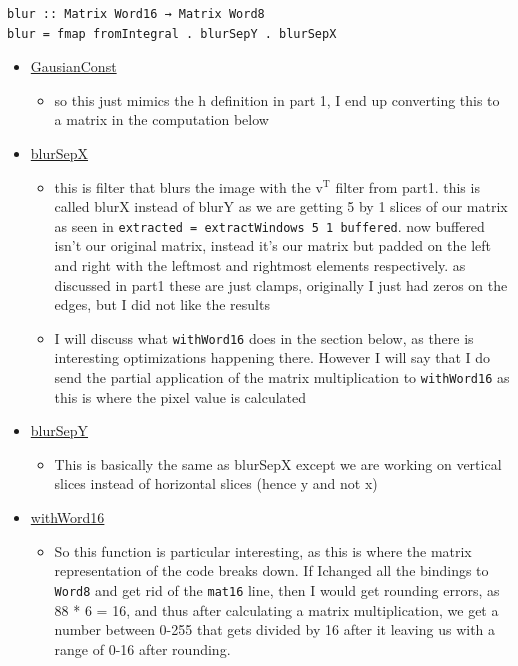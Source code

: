 \documentclass{article}
\begin{document}
\begin{enumerate}
\begin{enumerate}
\begin{itemize}
\begin{itemize}
\begin{verbatim}
blur :: Matrix Word16 → Matrix Word8
blur = fmap fromIntegral . blurSepY . blurSepX
\end{verbatim}

\begin{itemize}
\item \uline{GausianConst}
\begin{itemize}
\item so this just mimics the h definition in part 1, Ι  end up
converting this to a matrix in the computation below
\end{itemize}
\item \uline{blurSepX}
\begin{itemize}
\item this is filter that blurs the image with the v$^{\text{T}}$ filter from
part1. this is called blurX instead of blurY as we are getting
5 by 1 slices of our matrix as seen in
\texttt{extracted = extractWindows 5 1 buffered}. now buffered isn't
our original matrix, instead it's our matrix but padded on the
left and right with the leftmost and rightmost elements
respectively. as discussed in part1 these are just clamps,
originally Ι just had zeros on the edges, but Ι did not like the results
\item I will discuss what \texttt{withWord16} does in the section below, as
there is interesting optimizations happening there. However I
will say that Ι do send the partial application of the matrix
multiplication to \texttt{withWord16} as this is where the pixel
value is calculated
\end{itemize}

\item \uline{blurSepY}
\begin{itemize}
\item This is basically the same as blurSepX except we are working
on vertical slices instead of horizontal slices (hence y and not x)
\end{itemize}

\item \uline{withWord16}
\begin{itemize}
\item So this function is particular interesting, as this is where
the matrix representation of the code breaks down. If Ιchanged
all the bindings to \texttt{Word8} and get rid of the \texttt{mat16} line,
then I would get rounding errors, as 88 * 6 = 16, and thus after
calculating a matrix multiplication, we get a number between
0-255 that gets divided by 16 after it leaving us with a range
of 0-16 after rounding.


\end{itemize}
\end{itemize}
\end{itemize}
\end{itemize}
\end{enumerate}
\end{enumerate}
\end{document}
